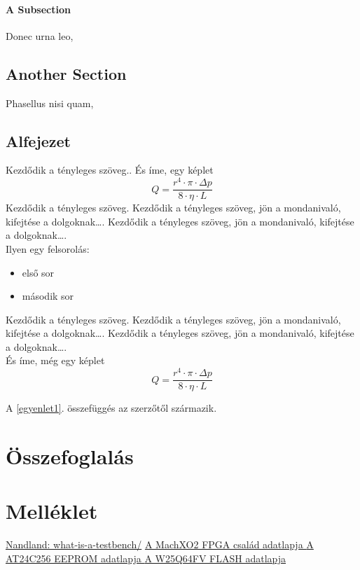 \documentclass[a4paper,12pt,oneside]{book}
\begin{document}
\subsubsection{A Subsection}

Donec urna leo, 

\section{Another Section}

Phasellus nisi quam, 

\section{Alfejezet}
Kezdődik a tényleges szöveg..
És íme, egy képlet
\begin{equation}
Q=\frac{r^4\cdot \pi \cdot \Delta p}{8\cdot \eta\cdot L}
\end{equation}
Kezdődik a tényleges szöveg. Kezdődik a tényleges szöveg, jön a mondanivaló, kifejtése a dolgoknak…. Kezdődik a tényleges szöveg, jön a mondanivaló, kifejtése a dolgoknak….\\

Ilyen egy felsorolás:
\begin{itemize}
	\item első sor
	\item második sor
\end{itemize}
Kezdődik a tényleges szöveg. Kezdődik a tényleges szöveg, jön a mondanivaló, kifejtése a dolgoknak…. Kezdődik a tényleges szöveg, jön a mondanivaló, kifejtése a dolgoknak….\\

És íme, még egy képlet
\begin{equation}\label{egyenlet1}
Q=\frac{r^4\cdot \pi \cdot \Delta p}{8\cdot \eta\cdot L}
\end{equation}

A \ref{egyenlet1}. összefüggés az \cite{fpgaadatlap} szerzőtől származik.
\backmatter
\chapter{Összefoglalás}
\appendix
\fi
\chapter{Melléklet}


\renewcommand{\refname}{Irodalomjegyzék}
\begin{thebibliography}{9}
	 \href{https://nandland.com/what-is-a-testbench/}{Nandland: what-is-a-testbench/}
     \href{https://datasheet.octopart.com/LCMXO2-4000HC-4MG132I-Lattice-Semiconductor-datasheet-12584740.pdf}{A MachXO2 FPGA család adatlapja }
	  \href{https://ww1.microchip.com/downloads/en/DeviceDoc/doc0670.pdf}{A AT24C256 EEPROM adatlapja }
	 \href{https://ww1.microchip.com/downloads/en/DeviceDoc/doc0670.pdf}{A W25Q64FV FLASH adatlapja }
\end{thebibliography}
\end{document}
